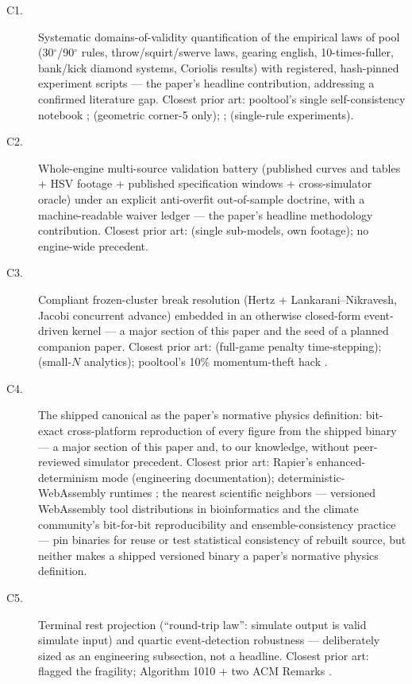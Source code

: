 \begin{description}
  \item[C1.] Systematic domains-of-validity quantification of the empirical
    laws of pool (30$^\circ$/90$^\circ$ rules, throw/squirt/swerve laws,
    gearing english, 10-times-fuller, bank/kick diamond systems, Coriolis
    results) with registered, hash-pinned experiment scripts --- the
    paper's headline
    contribution, addressing a confirmed literature gap. Closest prior
    art: pooltool's single self-consistency
    notebook \citep{kiefl2024pooltool}; \citet{cohen2002threecushion}
    (geometric corner-5 only); \citet{bayes1963collision};
    \citet{wallace1988billiard} (single-rule experiments).
  \item[C2.] Whole-engine multi-source validation battery (published
    curves and tables + HSV footage + published specification windows +
    cross-simulator oracle)
    under an explicit anti-overfit out-of-sample doctrine, with a
    machine-readable waiver ledger --- the paper's headline methodology
    contribution.
    Closest prior art: \citet{mathavan2010cushion,mathavan2014numerical}
    (single sub-models, own footage); no engine-wide precedent.
  \item[C3.] Compliant frozen-cluster break resolution (Hertz +
    Lankarani--Nikravesh, Jacobi concurrent advance) embedded in an
    otherwise closed-form event-driven kernel --- a major section of this
    paper and the seed of a planned companion paper. Closest prior art:
    \citet{gismerosmoreno2022multiple} (full-game penalty time-stepping);
    \citet{cross2023oblique} (small-$N$ analytics); pooltool's 10\%
    momentum-theft hack \citep{kiefl2024pooltool}.
  \item[C4.] The shipped canonical  as the paper's normative
    physics definition: bit-exact cross-platform reproduction of every
    figure from the shipped binary --- a major section of this paper and,
    to our knowledge, without peer-reviewed simulator precedent. Closest
    prior art: Rapier's enhanced-determinism mode (engineering
    documentation); deterministic-WebAssembly runtimes
    \citep{wasm2015nondeterminism}; the nearest scientific neighbors ---
    versioned WebAssembly tool distributions in bioinformatics and the
    climate community's bit-for-bit reproducibility and
    ensemble-consistency practice --- pin binaries for reuse or test
    statistical consistency of rebuilt source, but neither makes a
    shipped versioned binary a paper's normative physics definition.
  \item[C5.] Terminal rest projection (``round-trip law'': simulate output
    is valid simulate input) and quartic event-detection robustness ---
    deliberately sized as an engineering subsection, not a headline.
    Closest prior art: \citet{leckie2006event} flagged the
    fragility; Algorithm 1010 \citep{orellana2020algorithm1010} + two ACM
    Remarks \citep{demichele2022remark,demichele2024remark}.
\end{description}

